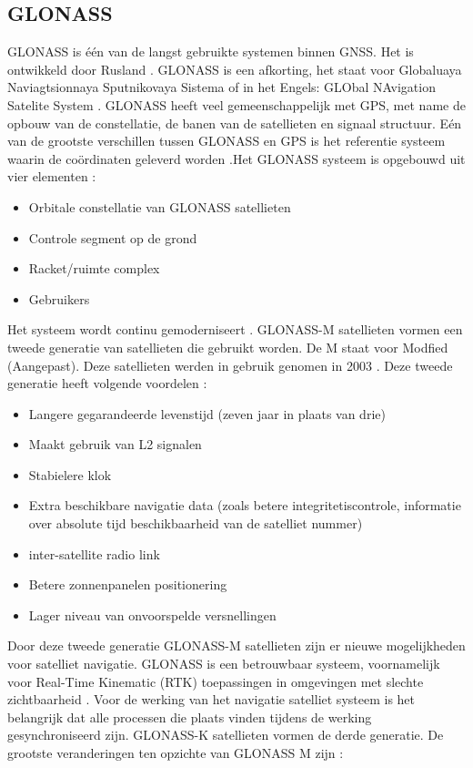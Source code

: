 \subsection{GLONASS}
\label{LGLO}
GLONASS is \'e\'en van de langst gebruikte systemen binnen GNSS. Het is ontwikkeld door Rusland \cite{LBibGLONASS2}. GLONASS is een afkorting, het staat voor Globaluaya Naviagtsionnaya Sputnikovaya Sistema of in het Engels: GLObal NAvigation Satelite System  \cite{LBibBeiDou,LBibGNSS8}. GLONASS heeft veel gemeenschappelijk met GPS, met name de opbouw van de constellatie, de banen van de satellieten en signaal structuur. E\'en van de grootste verschillen tussen GLONASS en GPS is het referentie systeem waarin de co\"ordinaten geleverd worden \cite{LBibGNSS8}.Het GLONASS systeem is opgebouwd uit vier elementen \cite{LBibGLONASS2}:
\begin{itemize}
	\item Orbitale constellatie van GLONASS satellieten
	\item Controle segment op de grond
	\item Racket/ruimte complex
	\item Gebruikers
\end{itemize} 
Het systeem wordt continu gemoderniseert \cite{LBibGNSS4}. GLONASS-M satellieten vormen een tweede generatie van satellieten die gebruikt worden\cite{LBibGNSS}. De M staat voor Modfied (Aangepast). Deze satellieten werden in gebruik genomen in 2003 \cite{LBibPPP}. Deze tweede generatie heeft volgende voordelen \cite{LBibGLONASS,LBibPPP}:
\begin{itemize}
	\item Langere gegarandeerde levenstijd (zeven jaar in plaats van drie)
	\item Maakt gebruik van L2 signalen
	\item Stabielere klok
	\item Extra beschikbare navigatie data (zoals betere integritetiscontrole, informatie over absolute tijd beschikbaarheid van de satelliet nummer)
	\item inter-satellite radio link
	\item Betere zonnenpanelen positionering
	\item Lager niveau van onvoorspelde versnellingen
\end{itemize}
Door deze tweede generatie GLONASS-M satellieten zijn er nieuwe mogelijkheden voor satelliet navigatie. GLONASS is een betrouwbaar systeem, voornamelijk voor Real-Time Kinematic (RTK) toepassingen in omgevingen met slechte zichtbaarheid \cite{LBibGLONASS}. Voor de werking van het navigatie satelliet systeem is het belangrijk dat alle processen die plaats vinden tijdens de werking gesynchroniseerd zijn. GLONASS-K satellieten vormen de derde generatie. De grootste veranderingen ten opzichte van GLONASS M zijn \cite{LBibGLONASS2}:
